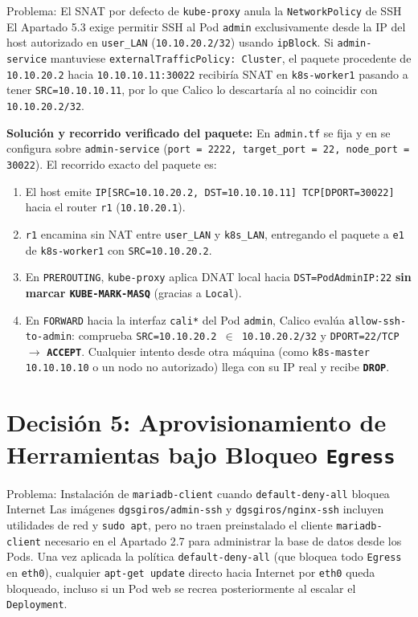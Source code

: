 \begin{decisionbox}{Problema: El SNAT por defecto de \texttt{kube-proxy} anula la \texttt{NetworkPolicy} de SSH}
El Apartado 5.3 exige permitir SSH al Pod \texttt{admin} exclusivamente desde la IP del host autorizado en \texttt{user\_LAN} (\texttt{10.10.20.2/32}) usando \texttt{ipBlock}. Si \texttt{admin-service} mantuviese \texttt{externalTrafficPolicy: Cluster}, el paquete procedente de \texttt{10.10.20.2} hacia \texttt{10.10.10.11:30022} recibiría SNAT en \texttt{k8s-worker1} pasando a tener \texttt{SRC=10.10.10.11}, por lo que Calico lo descartaría al no coincidir con \texttt{10.10.20.2/32}.
\end{decisionbox}

\textbf{Solución y recorrido verificado del paquete:}
En \texttt{admin.tf} se fija  y en  se configura  sobre \texttt{admin-service} (\texttt{port = 2222, target\_port = 22, node\_port = 30022}). El recorrido exacto del paquete es:
\begin{enumerate}
  \item El host emite \texttt{IP[SRC=10.10.20.2, DST=10.10.10.11] TCP[DPORT=30022]} hacia el router \texttt{r1} (\texttt{10.10.20.1}).
  \item \texttt{r1} encamina sin NAT entre \texttt{user\_LAN} y \texttt{k8s\_LAN}, entregando el paquete a \texttt{e1} de \texttt{k8s-worker1} con \texttt{SRC=10.10.20.2}.
  \item En \texttt{PREROUTING}, \texttt{kube-proxy} aplica DNAT local hacia \texttt{DST=PodAdminIP:22} \textbf{sin marcar \texttt{KUBE-MARK-MASQ}} (gracias a \texttt{Local}).
  \item En \texttt{FORWARD} hacia la interfaz \texttt{cali*} del Pod \texttt{admin}, Calico evalúa \texttt{allow-ssh-to-admin}: comprueba \texttt{SRC=10.10.20.2 $\in$ 10.10.20.2/32} y \texttt{DPORT=22/TCP} $\rightarrow$ \textbf{\texttt{ACCEPT}}. Cualquier intento desde otra máquina (como \texttt{k8s-master} \texttt{10.10.10.10} o un nodo no autorizado) llega con su IP real y recibe \textbf{\texttt{DROP}}.
\end{enumerate}

\section{Decisión 5: Aprovisionamiento de Herramientas bajo Bloqueo \texttt{Egress}}

\begin{decisionbox}{Problema: Instalación de \texttt{mariadb-client} cuando \texttt{default-deny-all} bloquea Internet}
Las imágenes \texttt{dgsgiros/admin-ssh} y \texttt{dgsgiros/nginx-ssh} incluyen utilidades de red y \texttt{sudo apt}, pero no traen preinstalado el cliente \texttt{mariadb-client} necesario en el Apartado 2.7 para administrar la base de datos desde los Pods. Una vez aplicada la política \texttt{default-deny-all} (que bloquea todo \texttt{Egress} en \texttt{eth0}), cualquier \texttt{apt-get update} directo hacia Internet por \texttt{eth0} queda bloqueado, incluso si un Pod web se recrea posteriormente al escalar el \texttt{Deployment}.
\end{decisionbox}

